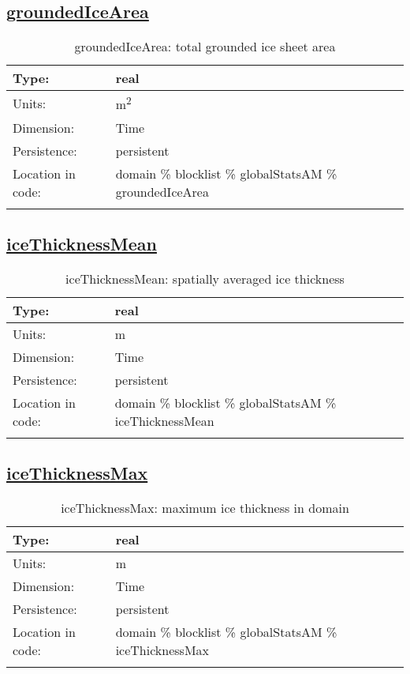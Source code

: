 \subsection[groundedIceArea]{\hyperref[sec:var_tab_globalStatsAM]{groundedIceArea}}
\label{subsec:var_sec_globalStatsAM_groundedIceArea}
\begin{center}
\begin{longtable}{| p{2.0in} | p{4.0in} |}
        \hline 
        Type: & real \\
        \hline 
        Units: & \si{m^2} \\
        \hline 
        Dimension: & Time \\
        \hline 
        Persistence: & persistent \\
        \hline 
         Location in code: & domain \% blocklist \% globalStatsAM \% groundedIceArea \\
         \hline 
    \caption{groundedIceArea: total grounded ice sheet area}
\end{longtable}
\end{center}
\subsection[iceThicknessMean]{\hyperref[sec:var_tab_globalStatsAM]{iceThicknessMean}}
\label{subsec:var_sec_globalStatsAM_iceThicknessMean}
\begin{center}
\begin{longtable}{| p{2.0in} | p{4.0in} |}
        \hline 
        Type: & real \\
        \hline 
        Units: & \si{m} \\
        \hline 
        Dimension: & Time \\
        \hline 
        Persistence: & persistent \\
        \hline 
         Location in code: & domain \% blocklist \% globalStatsAM \% iceThicknessMean \\
         \hline 
    \caption{iceThicknessMean: spatially averaged ice thickness}
\end{longtable}
\end{center}
\subsection[iceThicknessMax]{\hyperref[sec:var_tab_globalStatsAM]{iceThicknessMax}}
\label{subsec:var_sec_globalStatsAM_iceThicknessMax}
\begin{center}
\begin{longtable}{| p{2.0in} | p{4.0in} |}
        \hline 
        Type: & real \\
        \hline 
        Units: & \si{m} \\
        \hline 
        Dimension: & Time \\
        \hline 
        Persistence: & persistent \\
        \hline 
         Location in code: & domain \% blocklist \% globalStatsAM \% iceThicknessMax \\
         \hline 
    \caption{iceThicknessMax: maximum ice thickness in domain}
\end{longtable}
\end{center}
